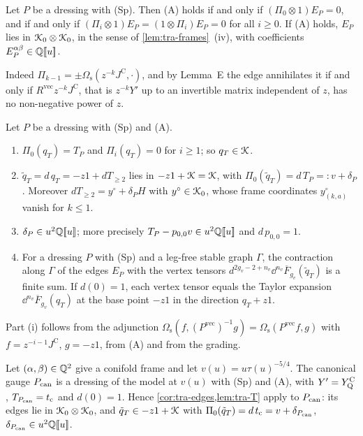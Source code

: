 \begin{cor}
\label{cor:tra-edges}
Let $P$ be a dressing with (Sp). Then (A) holds if and only if $(\Pi_0\otimes1)E_P=0$, and if and only if $(\Pi_i\otimes1)E_P=(1\otimes\Pi_i)E_P=0$ for all $i\geq0$. If (A) holds, $E_P$ lies in $\mathcal{K}_{0}\otimes\mathcal{K}_{0}$, in the sense of \cref{lem:tra-frames}~(iv), with coefficients $E_P^{\alpha\beta}\in\mathbb{Q}[\![ u ]\!]$.
\end{cor}

Indeed $\Pi_{k-1}=\pm\Omega_{\mathrm s}(z^{-k}J^{\mathrm C},\cdot)$, and by Lemma~E the edge annihilates it if and only if $R^{\mathrm{vec}}z^{-k}J^{\mathrm C}$, that is $z^{-k}Y'$ up to an invertible matrix independent of $z$, has no non-negative power of $z$.

\begin{lem}
\label{lem:tra-T}
Let $P$ be a dressing with (Sp) and (A).
\begin{enumerate}
\item $\Pi_0(q_T)=T_P$ and $\Pi_i(q_T)=0$ for $i\geq1$; so $q_T\in\mathcal{K}$.
\item $\tilde q_T=d\,q_T=-z1+dT_{\geq2}$ lies in $-z1+\mathcal{K}=\mathcal{K}$, with $\Pi_0(\tilde q_T)=d\,T_P=:v+\delta_P$. Moreover $dT_{\geq2}=y^\circ+\delta_PH$ with $y^\circ\in\mathcal{K}_{0}$, whose frame coordinates $y^\circ_{(k,a)}$ vanish for $k\leq1$.
\item $\delta_P\in u^2\mathbb{Q}[\![ u ]\!]$; more precisely $T_P-p_{0,0}v\in u^2\mathbb{Q}[\![ u ]\!]$ and $d\,p_{0,0}=1$.
\item For a dressing $P$ with (Sp) and a leg-free stable graph $\Gamma$, the contraction along $\Gamma$ of the edges $E_P$ with the vertex tensors $d^{2g_v-2+n_v}\dd^{n_v}\overline F_{g_v}(\tilde q_T)$ is a finite sum. If $d(0)=1$, each vertex tensor equals the Taylor expansion $\dd^{n_v}\overline F_{g_v}(q_T)$ at the base point $-z1$ in the direction $q_T+z1$.
\end{enumerate}
\end{lem}

Part (i) follows from the adjunction $\Omega_{\mathrm s}(f,(P^{\mathrm{vec}})^{-1}g)=\Omega_{\mathrm s}(P^{\mathrm{vec}}f,g)$ with $f=z^{-i-1}J^{\mathrm C}$, $g=-z1$, from (A) and from the grading.

\begin{prop}
\label{prop:tra-can}
Let $(\alpha,\beta)\in\mathbb{Q}^2$ give a conifold frame and let $v(u)=u\tau(u)^{-5/4}$. The canonical gauge $P_{\mathrm{can}}$ is a dressing of the model at $v(u)$ with (Sp) and (A), with $Y'=Y^{\mathrm{C}}_{\mathrm{Q}}$, $T_{P_{\mathrm{can}}}=t_{\mathrm{c}}$ and $d(0)=1$. Hence \cref{cor:tra-edges,lem:tra-T} apply to $P_{\mathrm{can}}$: its edges lie in $\mathcal{K}_{0}\otimes\mathcal{K}_{0}$, and $\tilde q_T\in-z1+\mathcal{K}$ with $\Pi_0(\tilde q_T)=d\,t_{\mathrm{c}}=v+\delta_{P_{\mathrm{can}}}$, $\delta_{P_{\mathrm{can}}}\in u^2\mathbb{Q}[\![ u ]\!]$.
\end{prop}

